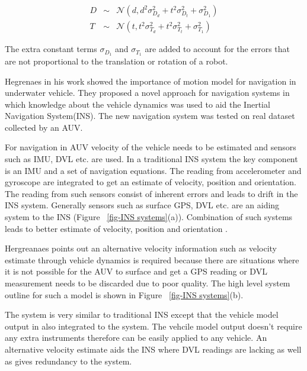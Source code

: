 \documentclass[12pt]{dalcsthesis}
\begin{document}
\begin{equation}
\label{eq-:noise_model_yapp}
\begin{aligned}
D &\sim& \mathcal{{N}}(d,d^2\sigma_{D_{d}}^2+t^2\sigma_{D_{t}}^2+\sigma_{D_{1}}^2) \\
T &\sim& \mathcal{{N}}(t,t^2\sigma_{T_{d}}^2+t^2\sigma_{T_{t}}^2+\sigma_{T_{1}}^2)
\end{aligned}
\end{equation}

The extra constant terms $\sigma_{D_{1}}$ and $\sigma_{T_{1}}$ are added to account for the errors that are not proportional to the translation or rotation of a robot. 

Hegrenaes \cite{Hegrenæs2008} in his work showed the importance of motion model for navigation in underwater vehicle. They proposed a novel approach for navigation systems in which knowledge about the vehicle dynamics was used to aid the Inertial Navigation System(INS). The new navigation system was tested on real dataset collected by an AUV.

For navigation in AUV velocity of the vehicle needs to be estimated and sensors such as IMU, DVL etc. are used. In a traditional INS system the key component is an IMU and a set of navigation equations. The reading from accelerometer and gyroscope are integrated to get an estimate of velocity, position and orientation. The reading from such sensors consist of inherent errors and leads to drift in the INS system. Generally sensors such as surface GPS, DVL etc. are an aiding system to the INS (Figure ~\ref{fig-INS systems}(a)). Combination of such systems leads to better estimate of velocity, position and orientation \cite{leonard1998autonomous}. 

Hergreanaes \cite{Hegrenæs2008} points out an alternative velocity information such as velocity estimate through vehicle dynamics is required because there are situations where it is not possible for the AUV to surface and get a GPS reading or DVL measurement needs to be discarded due to poor quality. The high level system outline for such a model is shown in Figure ~\ref{fig-INS systems}(b).

The system is very similar to traditional INS except that the vehicle model output in also integrated to the system. The vehcile model output doesn't require any extra instruments therefore can be easily applied to any vehicle. An alternative velocity estimate aids the INS where DVL readings are lacking as well as gives redundancy to the system. 
\end{document}
